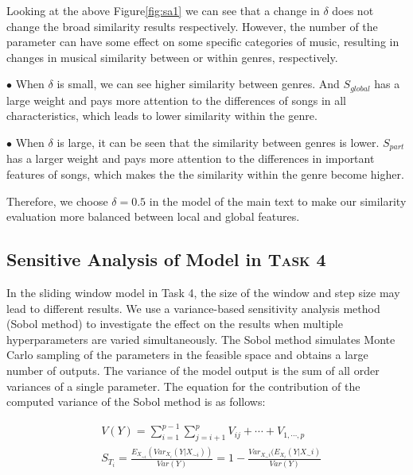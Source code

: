 \documentclass[12pt]{article}  %
\newenvironment{shrinkeq}[1]
{ \bgroup
	\addtolength\abovedisplayshortskip{#1}
	\addtolength\abovedisplayskip{#1}
	\addtolength\belowdisplayshortskip{#1}
	\addtolength\belowdisplayskip{#1}}
{\egroup\ignorespacesafterend}
\begin{document}
Looking at the above Figure\eqref{fig:sa1} we can see that a change in $\delta$ does not change the broad similarity results respectively. However, the number of the parameter can have some effect on some specific categories of music, resulting in changes in musical similarity between or within genres, respectively.

$\bullet$ When $\delta$ is small, we can see higher similarity between genres. And $S_{global}$ has a large weight and pays more attention to the differences of songs in all characteristics, which leads to lower similarity within the genre.

$\bullet$ When $\delta$ is large, it can be seen that the similarity between genres is lower. $S_{part}$ has a larger weight and pays more attention to the differences in important features of songs, which makes the the similarity within the genre become higher.

Therefore, we choose $\delta=0.5$ in the model of the main text to make our similarity evaluation more balanced between local and global features.

\vspace{-0.3cm}
\subsection{Sensitive Analysis of Model in \textsc{Task} 4 }
\vspace{-0.3cm}
In the sliding window model in Task 4, the size of the window and step size may lead to different results. We use a variance-based sensitivity analysis method (Sobol method)\cite{8} to investigate the effect on the results when multiple hyperparameters are varied simultaneously. The Sobol method simulates Monte Carlo sampling of the parameters in the feasible space and obtains a large number of outputs. The variance of the model output is the sum of all order variances of a single parameter. The equation for the contribution of the computed variance of the Sobol method is as follows:

\begin{shrinkeq}{-1.5ex}
	\begin{equation}
		\begin{split}
		&V(Y)=\sum\limits_{i=1}^{p-1}\sum\limits_{j=i+1}^{p}V_{ij}+\cdots+V_{1,\cdots,p}\\
		&S_{T_i}=\frac{E_{X_{\sim i}}(Var_{X_i}(Y|X_{\sim i}))}{Var(Y)}=1-\frac{Var_{X_\sim i}(E_{X_i}(Y|X_\sim i)}{Var(Y)}
		\end{split}
	\end{equation}
\end{shrinkeq}
\end{document}

